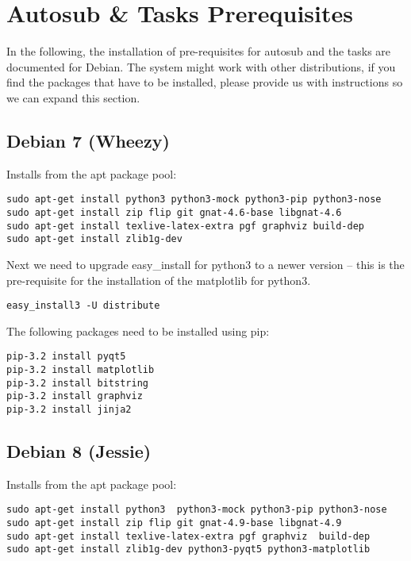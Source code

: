 \section{Autosub \& Tasks Prerequisites} \label{system_prerequisites}

In the following, the installation of pre-requisites for autosub and the tasks
are documented for Debian. The system might work with other distributions, if you
find the packages that have to be installed, please provide us with instructions
so we can expand this section.

\subsection{Debian 7 (Wheezy)}

Installs from the apt package pool:

\begin{verbatim}
sudo apt-get install python3 python3-mock python3-pip python3-nose
sudo apt-get install zip flip git gnat-4.6-base libgnat-4.6
sudo apt-get install texlive-latex-extra pgf graphviz build-dep
sudo apt-get install zlib1g-dev
\end{verbatim}

Next we need to upgrade easy\_install for python3 to a newer version -- this
is the pre-requisite for the installation of the matplotlib for python3.

\begin{verbatim}
easy_install3 -U distribute
\end{verbatim}

The following packages need to be installed using pip:

\begin{verbatim}
pip-3.2 install pyqt5
pip-3.2 install matplotlib
pip-3.2 install bitstring
pip-3.2 install graphviz
pip-3.2 install jinja2
\end{verbatim}


\subsection{Debian 8 (Jessie)}

Installs from the apt package pool:

\begin{verbatim}
sudo apt-get install python3  python3-mock python3-pip python3-nose
sudo apt-get install zip flip git gnat-4.9-base libgnat-4.9
sudo apt-get install texlive-latex-extra pgf graphviz  build-dep
sudo apt-get install zlib1g-dev python3-pyqt5 python3-matplotlib
\end{verbatim}

